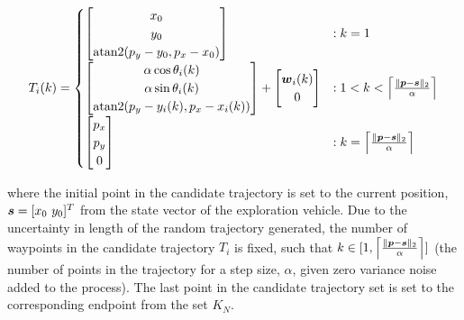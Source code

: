\begin{equation}
\label{eq:mcpp}
T_{i}(k) = \begin{cases}
	\begin{bmatrix}
		x_0 \\
		y_0\\
		\text{atan2}(p_y - y_0, p_x - x_0)
	\end{bmatrix} & : k = 1 \\

	\begin{bmatrix}
		\alpha \cos \theta_i(k) \\
		\alpha \sin \theta_i(k) \\
		\text{atan2}(p_y - y_i(k), p_x - x_i(k))
	\end{bmatrix} + \begin{bmatrix} 
		{\it{\boldsymbol{w}}}_i(k) \\
		0
	\end{bmatrix} & : 1 < k < \Big\lceil \frac{\|{\it{\boldsymbol{p}}} - {\it{\boldsymbol{s}}}\|_2}{\alpha} \Big\rceil \\


	\begin{bmatrix} p_x \\ p_y \\ 0\end{bmatrix} & : k = \Big\lceil \frac{\|{\it{\boldsymbol{p}}} - {\it{\boldsymbol{s}}}\|_2}{\alpha} \Big\rceil \\

\end{cases}
\end{equation}

\noindent where the initial point in the candidate trajectory is set to the current position, $\vect{s}=[x_0\ y_0]^T$ from the state vector of the exploration vehicle. Due to the uncertainty in length of the random trajectory generated, the number of waypoints in the candidate trajectory $T_i$ is fixed, such that $k \in [1, \Big\lceil \frac{\|{\it{\boldsymbol{p}}}- {\it{\boldsymbol{s}}}\|_2}{\alpha} \Big\rceil]$ (the number of points in the trajectory for a step size, $\alpha$, given zero variance noise added to the process). The last point in the candidate trajectory set is set to the corresponding endpoint from the set $K_N$.

